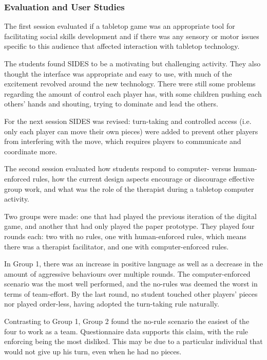 \documentclass[runningheads]{llncs}
\begin{document}
\subsubsection{Evaluation and User Studies}
\par The first session evaluated if a tabletop game was an appropriate tool for facilitating social skills development and if there was any sensory or motor issues specific to this audience that affected interaction with tabletop technology.
\par The students found SIDES to be a motivating but challenging activity. They also thought the interface was appropriate and easy to use, with much of the excitement revolved around the new technology. There were still some problems regarding the amount of control each player has, with some children pushing each others' hands and shouting, trying to dominate and lead the others.
\par For the next session SIDES was revised: turn-taking and controlled access (i.e. only each player can move their own pieces) were added to prevent other players from interfering with the move, which requires players to communicate and coordinate more.
\par The second session evaluated how students respond to computer- versus human-enforced rules, how the current design aspects encourage or discourage effective group work, and what was the role of the therapist during a tabletop computer activity.
\par Two groups were made: one that had played the previous iteration of the digital game, and another that had only played the paper prototype. They played four rounds each: two with no rules, one with human-enforced rules, which means there was a therapist facilitator, and one with computer-enforced rules.
\par In Group 1, there was an increase in positive language as well as a decrease in the amount of aggressive behaviours over multiple rounds. The computer-enforced scenario was the most well performed, and the no-rules was deemed the worst in terms of team-effort. By the last round, no student touched other players' pieces nor played order-less, having adopted the turn-taking rule naturally.
\par Contrasting to Group 1, Group 2 found the no-rule scenario the easiest of the four to work as a team. Questionnaire data supports this claim, with the rule enforcing being the most disliked. This may be due to a particular individual that would not give up his turn, even when he had no pieces.
\end{document}
